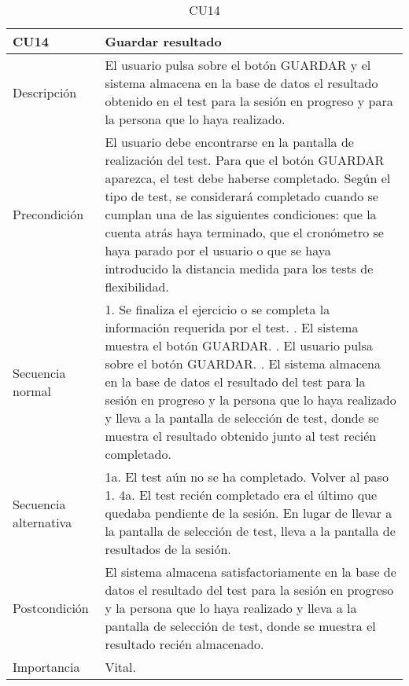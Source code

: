 \begin{table}[H]
\label{CU14}
\begin{center}
\begin{tabular}{| l | p{10cm} |}
\hline
CU14 & Guardar resultado\\
\hline
Descripción & El usuario pulsa sobre el botón GUARDAR y el sistema almacena en la base de datos el resultado obtenido en el test para la sesión en progreso y para la persona que lo haya realizado.\\
\hline
Precondición & El usuario debe encontrarse en la pantalla de realización del test. Para que el botón GUARDAR aparezca, el test debe haberse completado. Según el tipo de test, se considerará completado cuando se cumplan una de las siguientes condiciones: que la cuenta atrás haya terminado, que el cronómetro se haya parado por el usuario o que se haya introducido la distancia medida para los tests de flexibilidad.\\
\hline
Secuencia normal & 1. Se finaliza el ejercicio o se completa la información requerida por el test.
\newline 2. El sistema muestra el botón GUARDAR.
\newline 3. El usuario pulsa sobre el botón GUARDAR.
\newline 4. El sistema almacena en la base de datos el resultado del test para la sesión en progreso y la persona que lo haya realizado y lleva a la pantalla de selección de test, donde se muestra el resultado obtenido junto al test recién completado.\\
\hline
Secuencia alternativa & 1a. El test aún no se ha completado. Volver al paso 1.
\newline 4a. El test recién completado era el último que quedaba pendiente de la sesión. En lugar de llevar a la pantalla de selección de test, lleva a la pantalla de resultados de la sesión.\\
\hline
Postcondición & El sistema almacena satisfactoriamente en la base de datos el resultado del test para la sesión en progreso y la persona que lo haya realizado y lleva a la pantalla de selección de test, donde se muestra el resultado recién almacenado.\\
\hline
Importancia & Vital.\\
\hline
\end{tabular}
\end{center}
\caption{CU14}
\end{table}

